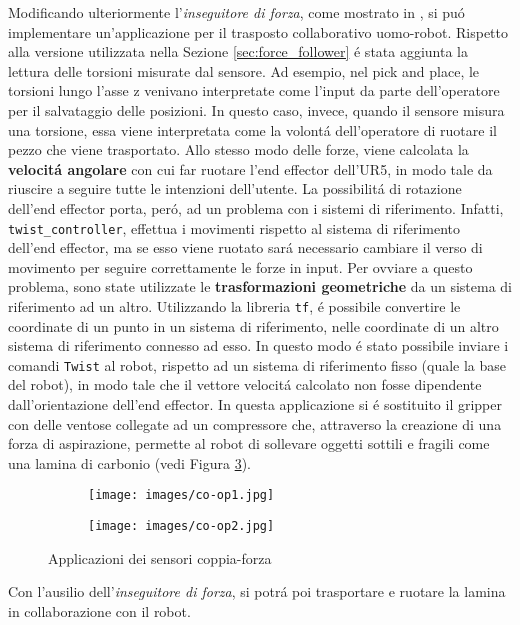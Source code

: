 Modificando ulteriormente l'\textit{inseguitore di forza}, come mostrato in \cite{full_force_follower}, si pu\'{o} implementare un'applicazione 
per il trasposto collaborativo uomo-robot. Rispetto alla versione utilizzata nella Sezione \ref{sec:force_follower} \'{e} stata aggiunta 
la lettura delle torsioni misurate dal sensore. 
Ad esempio, nel pick and place, le torsioni lungo l'asse z venivano interpretate come l'input da parte dell'operatore per il salvataggio 
delle posizioni. In questo caso, invece, quando il sensore misura una torsione, essa viene interpretata come la volont\'{a} 
dell'operatore di ruotare il pezzo che viene trasportato.
Allo stesso modo delle forze, viene calcolata la \textbf{velocit\'{a} angolare} 
con cui far ruotare l'end effector dell'UR5, in modo tale da riuscire a seguire tutte le intenzioni dell'utente. 
La possibilit\'{a} di rotazione dell'end effector porta, per\'{o}, ad un problema con i sistemi di riferimento. 
Infatti, \verb|twist_controller|, effettua i movimenti rispetto al sistema di riferimento dell'end effector, ma se esso viene ruotato 
sar\'{a} necessario cambiare il verso di movimento per seguire correttamente le forze in input. Per ovviare a questo 
problema, sono state utilizzate le \textbf{trasformazioni geometriche} da un sistema di riferimento ad un altro. 
Utilizzando la libreria \verb|tf|, \'{e} possibile convertire le coordinate di un punto in un sistema di riferimento, nelle 
coordinate di un altro sistema di riferimento connesso ad esso. In questo modo \'{e} stato possibile inviare i comandi 
\verb|Twist| al robot, rispetto ad un sistema di riferimento fisso (quale la base del robot), in modo tale che il vettore velocit\'{a} 
calcolato non fosse dipendente dall'orientazione dell'end effector. 
In questa applicazione si \'{e} sostituito il gripper con delle ventose collegate ad un compressore che, attraverso la creazione di 
una forza di aspirazione, permette al robot di sollevare oggetti sottili e fragili come una lamina di carbonio (vedi Figura \ref{fig:co-op}).
\begin{figure}[H]
    \centering
    \begin{subfigure}[b]{0.45\textwidth}
        \texttt{[image: images/co-op1.jpg]}
        \label{fig:co-op1}
    \end{subfigure}
    \qquad
    \begin{subfigure}[b]{0.45\textwidth}
        \texttt{[image: images/co-op2.jpg]}
        \label{fig:co-op2}
    \end{subfigure}
    \caption{Applicazioni dei sensori coppia-forza}\label{fig:co-op}
\end{figure}
Con l'ausilio dell'\textit{inseguitore di forza}, si potr\'{a} poi trasportare e ruotare la lamina in collaborazione con il robot.
